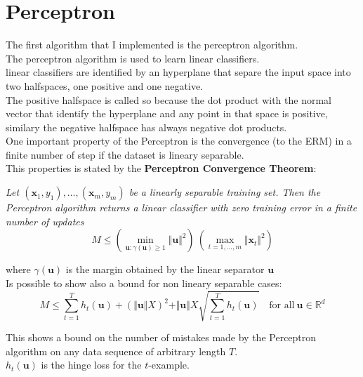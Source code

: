 \newpage
\section{Perceptron}

The first algorithm that I implemented is the perceptron algorithm.\\
The perceptron algorithm is used to learn linear classifiers.\\
linear classifiers are identified by an hyperplane that separe the input space into two halfspaces, one positive and one negative.\\
The positive halfspace is called so because the dot product with the normal vector that identify the hyperplane and any point in that space is positive, similary the negative halfspace has always negative dot products.\\
One important property of the Perceptron is the convergence (to the ERM) in a finite number of step if the dataset is lineary separable.\\
This properties is stated by the \textbf{Perceptron Convergence Theorem}:

\textit{Let $(\boldsymbol{x}_1 , y_1 ), \dots, (\boldsymbol{x}_m , y_m)$ be a linearly separable training set. Then the Perceptron algorithm returns a linear classifier with zero training error in a finite number of updates}
$$
M \leq \left(\underset{\boldsymbol{u} : \gamma(\boldsymbol{u}) \geq 1}{\min} \Vert \boldsymbol{u} \Vert^2 \right) \ \left( \underset{t = 1, \dots, m}{\max} \Vert \boldsymbol{x}_t \Vert^2 \right)
$$

where $\gamma (\boldsymbol{u})$ is the margin obtained by the linear separator $\boldsymbol{u}$\\ 
 
Is possible to show also a bound for non lineary separable cases:\\

$$
M \leq \sum_{t=1}^{T} h_{t}(\boldsymbol{u}) + (\Vert \boldsymbol{u} \Vert X)^2 + \Vert \boldsymbol{u} \Vert X \sqrt{\sum_{t=1}^{T}h_t (\boldsymbol{u})} \quad \text{for all}\ \boldsymbol{u} \in \mathbb{R}^d    
$$

This shows a bound on the number of mistakes made by the Perceptron algorithm on any data sequence of arbitrary length $T$.\\
$h_{t}(\boldsymbol{u})$ is the hinge loss for the $t$-example.\\

